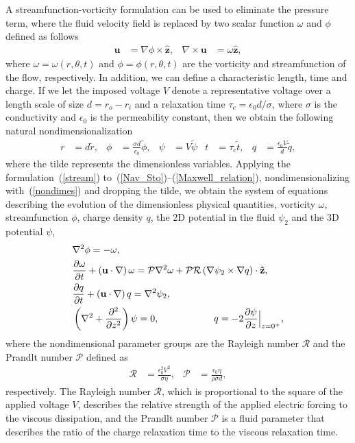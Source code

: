 A streamfunction-vorticity formulation can be used to eliminate the pressure term, where the fluid velocity field is replaced by two scalar function $\omega$ and $\phi$ defined as follows
\begin{align}
\label{stream}
\mathbf{u} &= \nabla\phi\times\hat{\mathbf{z}}, & \nabla\times\mathbf{u} &= \omega\hat{\mathbf{z}},
\end{align}
where $\omega = \omega(r,\theta,t)$ and $\phi = \phi(r,\theta,t)$ are the vorticity and streamfunction of the flow, respectively. In addition, we can define a characteristic length, time and charge. If we let the imposed voltage $V$ denote a representative voltage over a length scale of size $d = r_o - r_i$ and a relaxation time $\tau_c = \epsilon_0 d/\sigma$, where $\sigma$ is the conductivity and $\epsilon_0$ is the permeability constant, then we obtain the following natural nondimensionalization
\begin{align}
\label{nondimes}
r &= d \tilde{r},     & \phi &= \frac{\sigma d}{\epsilon_0}\tilde\phi, &  \psi &= V\tilde{\psi} & t &= \tau_c\tilde{t}, & q & = \frac{\epsilon_0 V}{d}\tilde{q},
\end{align}
where the tilde represents the dimensionless variables.
Applying the formulation~(\ref{stream}) to~(\ref{Nav_Sto})--(\ref{Maxwell_relation}), nondimensionalizing with~(\ref{nondimes}) and dropping the tilde, we obtain the system of equations describing the evolution of the dimensionless physical quantities, vorticity $\omega$, streamfunction $\phi$, charge density $q$, the 2D potential in the fluid $\psi_2$ and the 3D potential $\psi$,
\begin{subequations}
\begin{align}
\label{dim_less_1}
&\nabla^2\phi = -\omega, \\
\label{dim_less_2}
&\pd{\omega}{t}+\lb \mathbf{u}\cdot\nabla\rb\omega =\mathcal{P}\nabla^2\omega + \mathcal{PR}\lb \nabla\psi_2\times\nabla q\rb\cdot\mathbf{\hat{z}},\\
&\pd{q}{t}+\lb \mathbf{u}\cdot\nabla\rb q = \nabla^2\psi_2,\\
&\lb \nabla^2 + \pderiv[2]{}{z}\rb\psi = 0, \hspace{2cm} q = -2\pd{\psi}{z}\Big{|}_{z=0^+}, \label{dim_less_end}
\end{align}
\end{subequations}
where the nondimensional parameter groups are the Rayleigh number $\mathcal{R}$ and the Prandlt number $\mathcal{P}$ defined as
\begin{align}
 \mathcal{R} &= \frac{\epsilon_{0}^2V^2}{\sigma\eta}, & \mathcal{P} &= \frac{\epsilon_{0}\eta}{\rho\sigma d},
\end{align}
respectively.
The Rayleigh number $\mathcal{R}$, which is proportional to the square of the applied voltage $V$, describes the relative strength of the applied electric forcing to the viscous dissipation, and the Prandlt number $\mathcal{P}$ is a fluid parameter that describes the ratio of the charge relaxation time to the viscous relaxation time.

